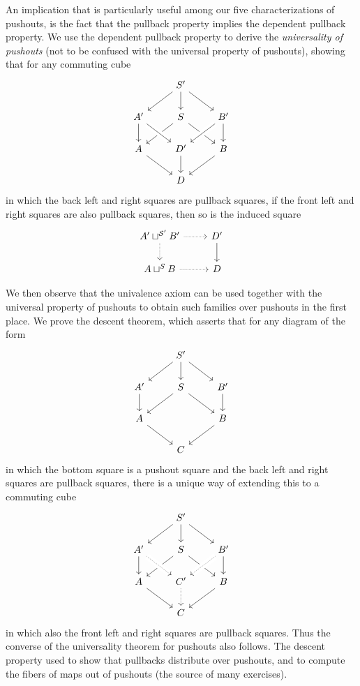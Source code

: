 An implication that is particularly useful among our five characterizations of pushouts, is the fact that the pullback property implies the dependent pullback property. We use the dependent pullback property to derive the \emph{universality of pushouts} (not to be confused with the universal property of pushouts), showing that for any commuting cube
\begin{equation*}
  \begin{tikzcd}
    & S' \arrow[dl] \arrow[d] \arrow[dr] \\
    A' \arrow[d] & S \arrow[dl] \arrow[dr] & B' \arrow[d] \arrow[dl,crossing over] \\
    A \arrow[dr] & D' \arrow[from=ul,crossing over] \arrow[d] & B \arrow[dl] \\
    & D
  \end{tikzcd}
\end{equation*}
in which the back left and right squares are pullback squares, if the front left and right squares are also pullback squares, then so is the induced square
\begin{equation*}
  \begin{tikzcd}
    A'\sqcup^{\mathcal{S}'}B' \arrow[r,densely dotted] \arrow[d,densely dotted] & D' \arrow[d] \\
    A\sqcup^S B \arrow[r,densely dotted] & D
  \end{tikzcd}
\end{equation*}

We then observe that the univalence axiom can be used together with the universal property of pushouts to obtain such families over pushouts in the first place. We prove the descent theorem, which asserts that for any diagram of the form
\begin{equation*}
  \begin{tikzcd}
    & S' \arrow[dl] \arrow[d] \arrow[dr] \\
    A' \arrow[d] & S \arrow[dl] \arrow[dr] & B' \arrow[d] \\
    A \arrow[dr] & & B \arrow[dl] \\
    & C
  \end{tikzcd}
\end{equation*}
in which the bottom square is a pushout square and the back left and right squares are pullback squares, there is a unique way of extending this to a commuting cube
\begin{equation*}
  \begin{tikzcd}
    & S' \arrow[dl] \arrow[d] \arrow[dr] \\
    A' \arrow[d] & S \arrow[dl] \arrow[dr] & B' \arrow[d] \\
    A \arrow[dr] & C' \arrow[from=ul,crossing over,densely dotted] \arrow[from=ur,crossing over,densely dotted] \arrow[d,densely dotted] & B \arrow[dl] \\
    & C
  \end{tikzcd}
\end{equation*}
in which also the front left and right squares are pullback squares. Thus the converse of the universality theorem for pushouts also follows. The descent property used to show that pullbacks distribute over pushouts, and to compute the fibers of maps out of pushouts (the source of many exercises).

